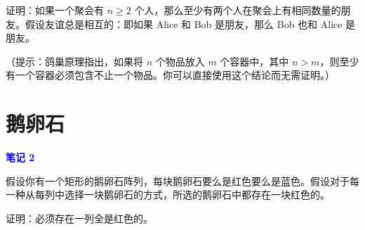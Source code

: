 \documentclass[11pt]{article}
\begin{document}
证明：如果一个聚会有 $n \geq 2$ 个人，那么至少有两个人在聚会上有相同数量的朋友。假设友谊总是相互的：即如果 Alice 和 Bob 是朋友，那么 Bob 也和 Alice 是朋友。

（提示：鸽巢原理指出，如果将 $n$ 个物品放入 $m$ 个容器中，其中 $n > m$，则至少有一个容器必须包含不止一个物品。你可以直接使用这个结论而无需证明。）

\section{鹅卵石}

\textcolor{blue}{\textbf{笔记 2}}

假设你有一个矩形的鹅卵石阵列，每块鹅卵石要么是红色要么是蓝色。假设对于每一种从每列中选择一块鹅卵石的方式，所选的鹅卵石中都存在一块红色的。

证明：必须存在一列全是红色的。
\end{document}
